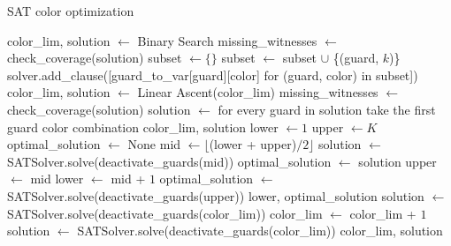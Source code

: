 \begin{algorithm}
\caption{SAT color optimization}\label{alg:SAT_color_opt}
\begin{algorithmic}[1]
    \State color\_lim, solution $\gets$ Binary Search
    \State missing\_witnesses $\gets$ check\_coverage(solution)
            \State subset $\gets \{\}$
                    \State subset $\gets$ subset $\cup$ \{(guard, $k$)\}
                \EndFor
            \EndFor
            \State solver.add\_clause([guard\_to\_var[guard][color] for (guard, color) in subset])
        \EndFor
        \State color\_lim, solution $\gets$ Linear Ascent(color\_lim)
        \State missing\_witnesses $\gets$ check\_coverage(solution)
    \EndWhile
    \State solution $\gets$ for every guard in solution take the first guard color combination
    \State \Return color\_lim, solution
\EndProcedure
{}
    \State lower $\gets 1$
    \State upper $\gets K$
    \State optimal\_solution $\gets$ None
        \State mid $\gets \lfloor$(lower + upper)$/2\rfloor$
        \State solution $\gets$ SATSolver.solve(deactivate\_guards(mid))
            \State optimal\_solution $\gets$ solution
            \State upper $\gets$ mid
        \Else
            \State lower $\gets$ mid + $1$
        \EndIf
    \EndWhile
        \State optimal\_solution $\gets$ SATSolver.solve(deactivate\_guards(upper))
    \EndIf
    \State \Return lower, optimal\_solution
\EndProcedure
{}
    \State solution $\gets$ SATSolver.solve(deactivate\_guards(color\_lim))
        \State color\_lim $\gets$ color\_lim + $1$
        \State solution $\gets$ SATSolver.solve(deactivate\_guards(color\_lim))
    \EndWhile
    \State \Return color\_lim, solution
\EndProcedure
\end{algorithmic}
\end{algorithm}

